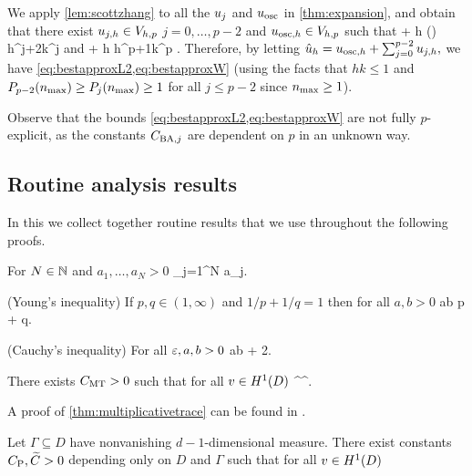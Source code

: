 
We apply \cref{lem:scottzhang} to all the $u_{j}$ and $u_{\mathrm{osc}}$ in \cref{thm:expansion}, and obtain that there exist $u_{j,h} \in V_{h,p}$ $j=0,\ldots,p-2$ and $u_{\mathrm{osc},h} \in V_{h,p}$ such that 
\beqs
\NLtD{\usj - \ujh} + h\NHoD{\usj - \ujh} \leq {}  \Pj\mleft(\nmax\mright) h^{j+2}k^j \Cfg
\eeqs
and
\beqs
\NLtD{\uosc - \uosch} + h\NHoD{\uosc - \uosch} \leq {} \Cosc\CAnk h^{p+1}k^p \Cfg.
\eeqs
Therefore, by letting $\hat{u}_{h} = u_{\mathrm{osc},h} + \sum_{j=0}^{p-2} u_{j,h},$ we have \cref{eq:bestapproxL2,eq:bestapproxW} (using the facts that $hk \leq 1$ and $P_{p-2}(n_{\max}) \geq P_{j}(n_{\max}) \geq 1$ for all $j \leq p-2$ since $n_{\max} \geq 1$).
\epf

Observe that the bounds \cref{eq:bestapproxL2,eq:bestapproxW} are not fully $p$-explicit, as the constants $C_{\mathrm{BA},j}$ are dependent on $p$ in an unknown way.

\subsection{Routine analysis results}\label{sec:anbackground}
In this  we collect together routine results that we use throughout the following proofs.

\bit
\item For $N \in \mathbb N$ and $a_1,\ldots,a_N > 0$
\beq\label{eq:simple}
 \leq \sum_{j=1}^N a_j.
\eeq
\item (Young's inequality) If $p,q \in (1,\infty)$ and $1/p + 1/q = 1$ then for all $a,b > 0$
  \beq\label{eq:young}
ab \leq {}p + q.
\eeq
\item (Cauchy's inequality) For all $\varepsilon,a,b > 0$
  \beq\label{eq:cauchy}
  ab \leq {} + 2.
\eeq
  \eit
  




\label{thm:multiplicativetrace}%
There exists $C_{\mathrm{MT}} > 0$ such that for all $v \in \HoD$
\beqs
{} \leq \CMT {}^\half {}^\half.
\eeqs
\enth

A proof of \cref{thm:multiplicativetrace} can be found in \cite[Last formula on p. 41]{Gr:85}.

\label{lem:poincare}
Let $\Gamma \subseteq D$ have nonvanishing $d-1$-dimensional measure. There exist constants $C_{\mathrm{P}},\widetilde{C} > 0$ depending only on $D$ and $\Gamma$ such that for all $v \in \HoD$

